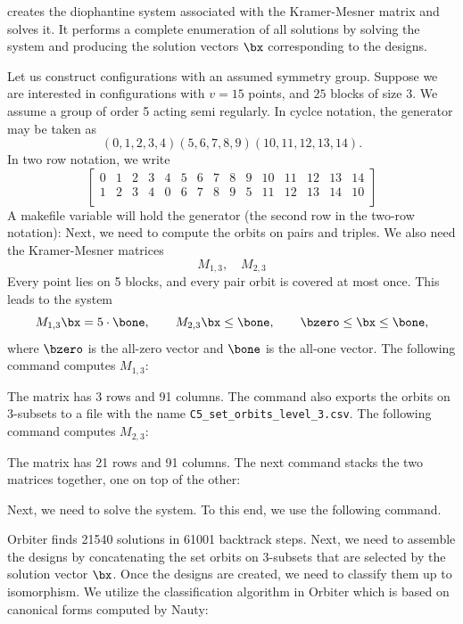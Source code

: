 
creates the diophantine system associated 
with the Kramer-Mesner matrix and solves it.
It performs a complete enumeration 
of all solutions by solving the system and producing 
the solution vectors $\bx$ 
corresponding to the designs. 


\bigskip

Let us construct configurations with an assumed symmetry group. 
Suppose we are interested in configurations with $v=15$ points, 
and $25$ blocks of size 3. 
We assume a group of order 5 acting semi regularly. In cyclce notation, 
the generator may be taken as 
$$
(0,1,2,3,4)(5,6,7,8,9)(10,11,12,13,14).
$$
In two row notation, we write
$$
\left[
\begin{array}{*{15}{c}}
0 & 1 & 2 & 3 & 4 & 5 & 6 & 7 & 8 & 9 & 10 & 11 & 12 & 13 & 14 \\
1 & 2 & 3 & 4 & 0 & 6 & 7 & 8 & 9 & 5 & 11 & 12 & 13 & 14 & 10 \\
\end{array}
\right]
$$
A makefile variable will hold the generator (the second row in the two-row notation):
Next, we need to compute the orbits on pairs and triples. 
We also need the Kramer-Mesner matrices 
$$
M_{1,3}, \quad M_{2,3}
$$
Every point lies on 5 blocks, and every pair orbit is covered at most once. 
This leads to the system
$$
M_{1,3} \bx = 5 \cdot \bone, \qquad M_{2,3} \bx \le \bone, \qquad \bzero \le \bx \le \bone,
$$
where $\bzero$ is the all-zero vector and $\bone$ is the all-one vector.
The following command computes $M_{1,3}$:


The matrix has 3 rows and 91 columns.
The command also exports the orbits on 3-subsets 
to a file with the name \verb'C5_set_orbits_level_3.csv'.
The following command computes $M_{2,3}$:


The matrix has 21 rows and 91 columns.
The next command stacks the two matrices together, one on top of the other:


Next, we need to solve the system. To this end, we use the following command.


Orbiter finds 21540 solutions in 61001 backtrack steps.
Next, we need to assemble the designs 
by concatenating the set orbits on 3-subsets 
that are selected by the solution vector $\bx$. 
Once the designs are created, we need to classify them up to isomorphism. 
We utilize the classification algorithm in Orbiter which is based on canonical forms 
computed by Nauty:

